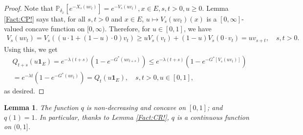 \documentclass[12pt,a4paper]{amsart}
\numberwithin{equation}{section}
\theoremstyle{plain}
\newtheorem{lem}[thm]{Lemma}
\theoremstyle{definition}
\theoremstyle{remark}
\newcounter{N}
\newcounter{n}[N]
\begin{document}
\begin{proof}
Note that $\mathbb P_{\delta_x}[e^{- X_s(uv_t)}] = e^{-V_s(uv_t)},x\in E, s,t>0, u \geq 0$.
Lemma \ref{Fact:CP!} says that, for all $s,t > 0$ and $x\in E$, $u\mapsto V_s(uv_t)(x) $ is a $[0,\infty]$-valued concave function on $[0,\infty)$.
Therefore, for $u\in [0,1]$, we have
\begin{align}
 V_s(uv_t)
   =V_s((u\cdot 1 + (1-u) \cdot 0)v_t)
   \geq uV_s(v_t) + (1-u) V_s(0\cdot v_t)
   = uv_{s+t},
   \quad s,t > 0.
 \end{align}
Using this, we get
\begin{align}
  & Q_{t+s}(u\mathbf 1_E)
 = e^{- \lambda (t+s)} ( 1-e^{-G^*(uv_{t+s})} )
 \leq e^{- \lambda(t+s)}( 1-e^{-G^*[V_s(uv_t)]} ) \\
 & = e^{-\lambda t}( 1-e^{-G^*(uv_t)} )
     = Q_t(u\mathbf 1_E),
 \quad s,t > 0, u \in [0,1],
 \end{align}
as desired.
\end{proof}
\begin{lem} \label{Lemma:qC!}
The function $q$ is non-decreasing and concave on $[0,1]$; and $q(1) = 1$.
In particular, thanks to Lemma \ref{Fact:CR!}, $q$ is a continuous function on $(0,1]$.
\end{lem}
\end{document}
